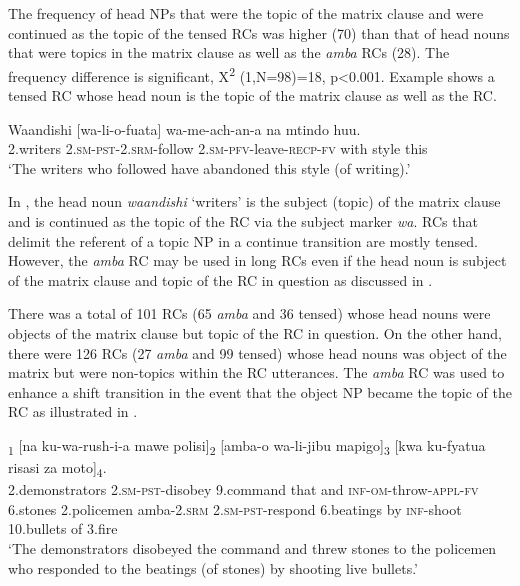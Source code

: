 \documentclass[output=paper,colorlinks,citecolor=brown]{langscibook}
\begin{document}
The frequency of head NPs that were the topic of the matrix clause and were continued as the topic of the tensed RCs was higher (70) than that of head nouns that were topics in the matrix clause as well as the \textit{amba} RCs (28). The frequency difference is significant, X\textsuperscript{2} (1,N=98)=18, p<0.001. Example  shows a tensed RC whose head noun is the topic of the matrix clause as well as the RC.

\ea%
    \label{ex:mwamzandi:27}
    \gll    Waandishi [wa-li-o-fuata] wa-me-ach-an-a na mtindo huu.\\
            2.writers \textsc{2.sm-pst-2.srm-}follow \textsc{2.sm-pfv-}leave\textsc{-recp-fv} with style this\\
    \glt    ‘The writers who followed have abandoned this style (of writing).’
\z

In , the head noun \textit{waandishi} ‘writers’ is the subject (topic) of the matrix clause and is continued as the topic of the RC via the subject marker \textit{wa}. RCs that delimit the referent of a topic NP in a continue transition are mostly tensed. However, the \textit{amba} RC may be used in long RCs even if the head noun is subject of the matrix clause and topic of the RC in question as discussed in .

There was a total of 101 RCs (65 \textit{amba} \-and 36 tensed) whose head nouns were objects of the matrix clause but topic of the RC in question. On the other hand, there were 126 RCs (27 \textit{amba} and 99 tensed) whose head nouns was object of the matrix but were non-topics within the RC utterances. The \textit{amba} RC was used to enhance a shift transition in the event that the object NP became the topic of the RC as illustrated in .

\ea%
    \label{ex:mwamzandi:28}
    \textsubscript{1} [na ku-wa-rush-i-a mawe polisi]\textsubscript{2} [amba-o wa-li-jibu mapigo]\textsubscript{3} [kwa ku-fyatua risasi za moto]\textsubscript{4}.\\
            2.demonstrators \textsc{2.sm-pst-}disobey 9.command that and \textsc{inf-om-}throw\textsc{-appl-fv} 6.stones 2.policemen amba\textsc{-2.srm} \textsc{2.sm-pst-}respond 6.beatings by \textsc{inf-}shoot 10.bullets of 3.fire\\
    \glt    ‘The demonstrators disobeyed the command and threw stones to the policemen who responded to the beatings (of stones) by shooting live bullets.’
\z
\end{document}
